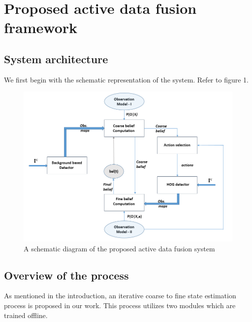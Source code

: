 \documentclass[10pt,twocolumn,letterpaper]{article}
\begin{document}
\section{Proposed active data fusion framework}

\subsection{System architecture}
We first begin with the schematic representation of the system. Refer to figure 1.

\begin{figure}
\begin{center}
\includegraphics[width=12cm]{img/block_dia_cir.PNG}
\end{center}
   \caption{A schematic diagram of the proposed active data fusion system}
\label{fig:Block dia}
\end{figure}

\subsection{Overview of the process}
As mentioned in the introduction, an iterative coarse to fine state estimation process is proposed in our work. This process utilizes two modules which are trained offline. 
\end{document}
